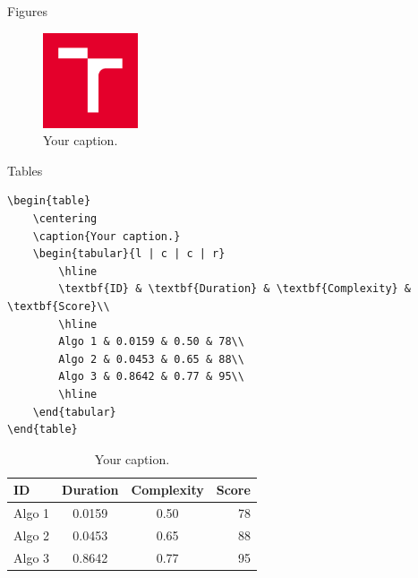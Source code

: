 \documentclass[aspectratio=1610]{beamer}
\begin{document}
\begin{frame}{Figures}
    \begin{figure}
        \centering
        \includegraphics[width=0.25\textwidth]{images/logo/logo_symbol.png}
        \caption{Your caption.}
    \end{figure}
\end{frame}


\begin{frame}[fragile]{Tables}
    \lstset{language=[LaTeX]TeX}
\begin{lstlisting}
\begin{table}
    \centering
    \caption{Your caption.}
    \begin{tabular}{l | c | c | r}
        \hline
        \textbf{ID} & \textbf{Duration} & \textbf{Complexity} & \textbf{Score}\\
        \hline
        Algo 1 & 0.0159 & 0.50 & 78\\
        Algo 2 & 0.0453 & 0.65 & 88\\
        Algo 3 & 0.8642 & 0.77 & 95\\
        \hline
    \end{tabular}
\end{table}
\end{lstlisting}
    \begin{table}
        \centering
        \caption{Your caption.}
        \begin{tabular}{l  | c | c |  r}
            \hline
            \textbf{ID} & \textbf{Duration} & \textbf{Complexity} & \textbf{Score}\\
            \hline
            Algo 1 & 0.0159 & 0.50 & 78\\
            Algo 2 & 0.0453 & 0.65 & 88\\
            Algo 3 & 0.8642 & 0.77 & 95\\
            \hline
        \end{tabular}
    \end{table}
\end{frame}
\end{document}
